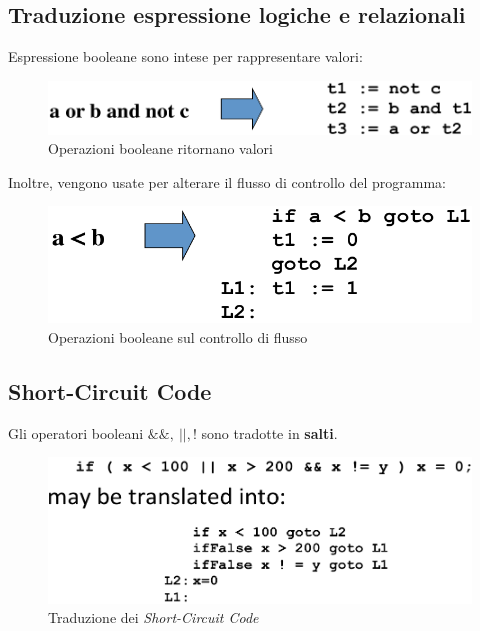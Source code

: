 \subsection{Traduzione espressione logiche e relazionali}
Espressione booleane sono intese per rappresentare valori:
\begin{figure}[H]
  \centering
  \includegraphics[scale=0.4]{res/image/bool_value}
  \caption{Operazioni booleane ritornano valori}
  \label{img:bool_value}
\end{figure}

Inoltre, vengono usate per alterare il flusso di controllo del programma:
\begin{figure}[H]
  \centering
  \includegraphics[scale=0.4]{res/image/bool_flow}
  \caption{Operazioni booleane sul controllo di flusso}
  \label{img:bool_flow}
\end{figure}

\subsection{Short-Circuit Code}
Gli operatori booleani $\&\&, \ ||, !$ sono tradotte in \textbf{salti}.

\begin{figure}[H]
  \centering
  \includegraphics[scale=0.4]{res/image/short_circuit}
  \caption{Traduzione dei \textit{Short-Circuit Code}}
  \label{img:short_circuit}
\end{figure}

